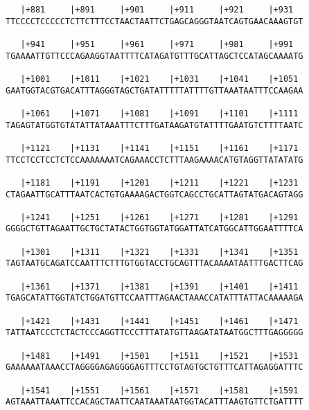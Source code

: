 \documentclass{article}
\begin{document}
\begin{Verbatim}
   |+881     |+891     |+901     |+911     |+921     |+931  
TTCCCCTCCCCCTCTTCTTTCCTAACTAATTCTGAGCAGGGTAATCAGTGAACAAAGTGT
                                                            
   |+941     |+951     |+961     |+971     |+981     |+991  
TGAAAATTGTTCCCAGAAGGTAATTTTCATAGATGTTTGCATTAGCTCCATAGCAAAATG
                                                            
   |+1001    |+1011    |+1021    |+1031    |+1041    |+1051 
GAATGGTACGTGACATTTAGGGTAGCTGATATTTTTATTTTGTTAAATAATTTCCAAGAA
                                                            
   |+1061    |+1071    |+1081    |+1091    |+1101    |+1111 
TAGAGTATGGTGTATATTATAAATTTCTTTGATAAGATGTATTTTGAATGTCTTTTAATC
                                                            
   |+1121    |+1131    |+1141    |+1151    |+1161    |+1171 
TTCCTCCTCCTCTCCAAAAAAATCAGAAACCTCTTTAAGAAAACATGTAGGTTATATATG
                                                            
   |+1181    |+1191    |+1201    |+1211    |+1221    |+1231 
CTAGAATTGCATTTAATCACTGTGAAAAGACTGGTCAGCCTGCATTAGTATGACAGTAGG
                                                            
   |+1241    |+1251    |+1261    |+1271    |+1281    |+1291 
GGGGCTGTTAGAATTGCTGCTATACTGGTGGTATGGATTATCATGGCATTGGAATTTTCA
                                                            
   |+1301    |+1311    |+1321    |+1331    |+1341    |+1351 
TAGTAATGCAGATCCAATTTCTTTGTGGTACCTGCAGTTTACAAAATAATTTGACTTCAG
                                                            
   |+1361    |+1371    |+1381    |+1391    |+1401    |+1411 
TGAGCATATTGGTATCTGGATGTTCCAATTTAGAACTAAACCATATTTATTACAAAAAGA
                                                            
   |+1421    |+1431    |+1441    |+1451    |+1461    |+1471 
TATTAATCCCTCTACTCCCAGGTTCCCTTTATATGTTAAGATATAATGGCTTTGAGGGGG
                                                            
   |+1481    |+1491    |+1501    |+1511    |+1521    |+1531 
GAAAAAATAAACCTAGGGGAGAGGGGAGTTTCCTGTAGTGCTGTTTCATTAGAGGATTTC
                                                            
   |+1541    |+1551    |+1561    |+1571    |+1581    |+1591 
AGTAAATTAAATTCCACAGCTAATTCAATAAATAATGGTACATTTAAGTGTTCTGATTTT
                                                            

\end{Verbatim}
\end{document}
